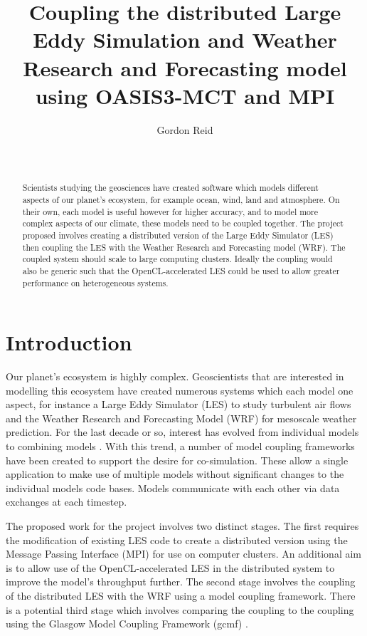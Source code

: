 \documentclass{acm_proc_article-sp}
\title{Coupling the distributed Large Eddy Simulation and Weather Research and
Forecasting model using OASIS3-MCT and MPI}
\author{
    \alignauthor
    Gordon Reid\\
    \affaddr{School of Computing Science}\\
    \affaddr{University of Glasgow}\\
    \email{1002536r@student.gla.ac.uk}
}
\renewcommand{\_}{\underscore\hspace{0pt}}
\begin{document}
\maketitle

\begin{abstract}

Scientists studying the geosciences have created software which models different
aspects of our planet's ecosystem, for example ocean, wind, land and atmosphere.
On their own, each model is useful however for higher accuracy, and to model
more complex aspects of our climate, these models need to be coupled together.
The project proposed involves creating a distributed version of the Large Eddy
Simulator (LES) then coupling the LES with the Weather Research and Forecasting
model (WRF). The coupled system should scale to large computing clusters.
Ideally the coupling would also be generic such that the OpenCL-accelerated LES
could be used to allow greater performance on heterogeneous systems.

\end{abstract}

\section*{Introduction}

Our planet's ecosystem is highly complex. Geoscientists that are interested in
modelling this ecosystem have created numerous systems which each model one
aspect, for instance a Large Eddy Simulator (LES) to study turbulent air flows
\cite{Nakayama2011,Nakayama2012} and the Weather Research and Forecasting Model
(WRF) for mesoscale weather prediction. For the last decade or so, interest has
evolved from individual models to combining models \cite{Michalakes2010}. With
this trend, a number of model coupling frameworks have been created to support
the desire for co-simulation. These allow a single application to make use of
multiple models without significant changes to the individual models code bases.
Models communicate with each other via data exchanges at each timestep.

The proposed work for the project involves two distinct stages. The first
requires the modification of existing LES code to create a distributed version
using the Message Passing Interface (MPI) for use on computer clusters. An
additional aim is to allow use of the OpenCL-accelerated LES
\cite{Vanderbauwhede2014} in the distributed system to improve the model's
throughput further. The second stage involves the coupling of the distributed
LES with the WRF using a model coupling framework. There is a potential third
stage which involves comparing the coupling to the coupling using the Glasgow
Model Coupling Framework (gcmf) \cite{Vanderbauwhede2014}.
\end{document}
